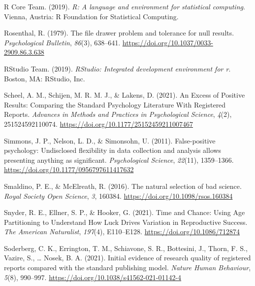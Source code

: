 \documentclass[
  ,man,mask,floatsintext]{apa6}
\newlength{\cslhangindent}
\newlength{\cslentryspacingunit} %
\newenvironment{CSLReferences}[2] %
 {%
  \setlength{\parindent}{0pt}
  \ifodd #1
  \let\oldpar\par
  \def\par{\hangindent=\cslhangindent\oldpar}
  \fi
  \setlength{\parskip}{#2\cslentryspacingunit}
 }%
 {}
\begin{document}
\begin{CSLReferences}{1}{0}
\leavevmode{}%
R Core Team. (2019). \emph{R: {A} language and environment for statistical computing}. Vienna, Austria: R Foundation for Statistical Computing.

\leavevmode{}%
Rosenthal, R. (1979). The file drawer problem and tolerance for null results. \emph{Psychological Bulletin}, \emph{86}(3), 638--641. \url{https://doi.org/10.1037/0033-2909.86.3.638}

\leavevmode{}%
RStudio Team. (2019). \emph{{RStudio}: {Integrated} development environment for r}. Boston, MA: RStudio, Inc.

\leavevmode{}%
Scheel, A. M., Schijen, M. R. M. J., \& Lakens, D. (2021). An {Excess} of {Positive Results}: {Comparing} the {Standard Psychology Literature With Registered Reports}. \emph{Advances in Methods and Practices in Psychological Science}, \emph{4}(2), 251524592110074. \url{https://doi.org/10.1177/25152459211007467}

\leavevmode{}%
Simmons, J. P., Nelson, L. D., \& Simonsohn, U. (2011). False-positive psychology: {Undisclosed} flexibility in data collection and analysis allows presenting anything as significant. \emph{Psychological Science}, \emph{22}(11), 1359--1366. \url{https://doi.org/10.1177/0956797611417632}

\leavevmode{}%
Smaldino, P. E., \& McElreath, R. (2016). The natural selection of bad science. \emph{Royal Society Open Science}, \emph{3}, 160384. \url{https://doi.org/10.1098/rsos.160384}

\leavevmode{}%
Snyder, R. E., Ellner, S. P., \& Hooker, G. (2021). Time and {Chance}: {Using Age Partitioning} to {Understand How Luck Drives Variation} in {Reproductive Success}. \emph{The American Naturalist}, \emph{197}(4), E110--E128. \url{https://doi.org/10.1086/712874}

\leavevmode{}%
Soderberg, C. K., Errington, T. M., Schiavone, S. R., Bottesini, J., Thorn, F. S., Vazire, S., \ldots{} Nosek, B. A. (2021). Initial evidence of research quality of registered reports compared with the standard publishing model. \emph{Nature Human Behaviour}, \emph{5}(8), 990--997. \url{https://doi.org/10.1038/s41562-021-01142-4}


\end{CSLReferences}
\end{document}
